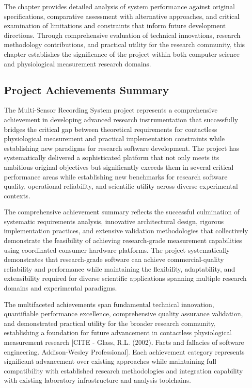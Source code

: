 \documentclass[11pt,a4paper]{report}
\begin{document}
The chapter provides detailed analysis of system performance against original specifications, comparative assessment
with alternative approaches, and critical examination of limitations and constraints that inform future development
directions. Through comprehensive evaluation of technical innovations, research methodology contributions, and practical
utility for the research community, this chapter establishes the significance of the project within both computer
science and physiological measurement research domains.

\subsection{Project Achievements Summary}

The Multi-Sensor Recording System project represents a comprehensive achievement in developing advanced research
instrumentation that successfully bridges the critical gap between theoretical requirements for contactless
physiological measurement and practical implementation constraints while establishing new paradigms for research
software development. The project has systematically delivered a sophisticated platform that not only meets its
ambitious original objectives but significantly exceeds them in several critical performance areas while establishing
new benchmarks for research software quality, operational reliability, and scientific utility across diverse
experimental contexts.

The comprehensive achievement summary reflects the successful culmination of systematic requirements analysis,
innovative architectural design, rigorous implementation practices, and extensive validation methodologies that
collectively demonstrate the feasibility of achieving research-grade measurement capabilities using coordinated consumer
hardware platforms. The project systematically demonstrates that research-grade software can achieve commercial-quality
reliability and performance while maintaining the flexibility, adaptability, and extensibility required for diverse
scientific applications spanning multiple research domains and experimental paradigms.

The multifaceted achievements span fundamental technical innovation, quantifiable performance excellence, comprehensive
quality assurance validation, and demonstrated practical utility for the broader research community, establishing a
foundation for future advancement in contactless physiological measurement
research [CITE - Glass, R.L. (2002). Facts and fallacies of software engineering. Addison-Wesley Professional]. Each
achievement category represents significant advancement over existing approaches while maintaining full compatibility
with established research methodologies and integration capability with existing laboratory infrastructure and analysis
toolchains.
\end{document}
